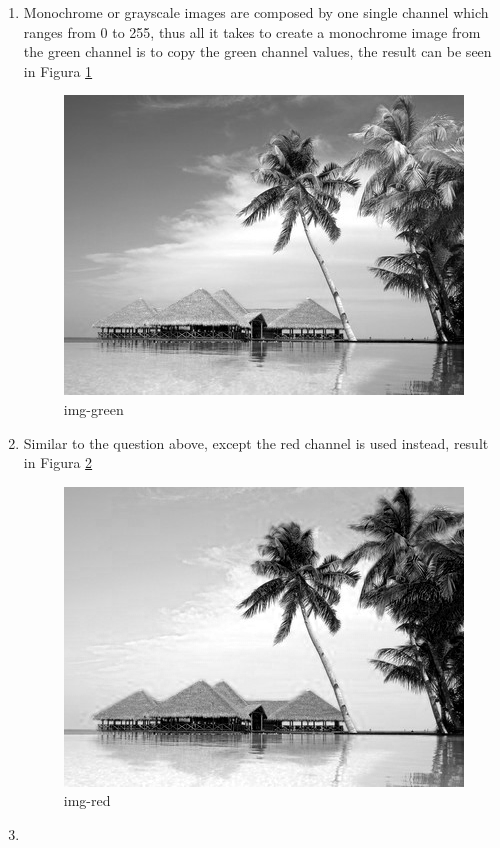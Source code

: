 \documentclass[12pt,a4paper]{article}
\begin{document}
\begin{enumerate}
\begin{enumerate}
\item Monochrome or grayscale images are composed by one single channel which ranges from 0 to 255, thus all it takes to create a monochrome image from the green channel is to copy the green channel values, the result can be seen in Figura \ref{fig:img-green}

\begin{figure}[ht]
\centering
\includegraphics{output/img-green}
\caption{img-green}
\label{fig:img-green}
\end{figure}

\item Similar to the question above, except the red channel is used instead, result in Figura \ref{fig:img-red}

\begin{figure}[ht]
\centering
\includegraphics{output/img-red}
\caption{img-red}
\label{fig:img-red}
\end{figure}

\item 


\end{enumerate}
\end{enumerate}
\end{document}
